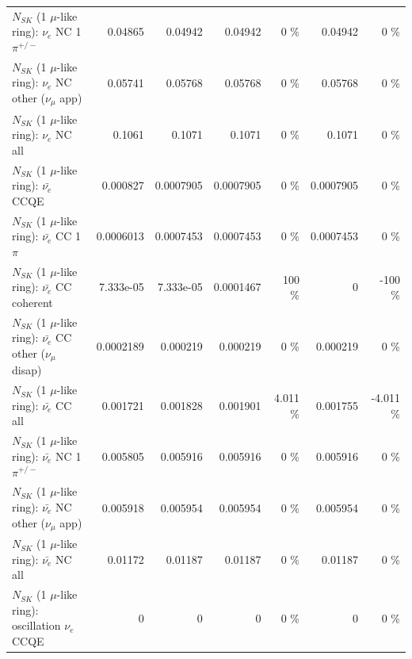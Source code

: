 \begin{table}
\begin{tabular}{| l | r | r | r  r | r  r |}
\hline
                           $N_{SK}$ (1 $\mu$-like ring): $\nu_e$ NC 1$\pi^{+/-}$ &         0.04865 &         0.04942 &         0.04942 &        0 \%  &         0.04942 &        0 \%  \\ 
                  $N_{SK}$ (1 $\mu$-like ring): $\nu_e$ NC other ($\nu_\mu$ app) &         0.05741 &         0.05768 &         0.05768 &        0 \%  &         0.05768 &        0 \%  \\ 
                                  $N_{SK}$ (1 $\mu$-like ring): $\nu_{e}$ NC all &          0.1061 &          0.1071 &          0.1071 &        0 \%  &          0.1071 &        0 \%  \\ 
\hline
\hline
\hline
                                $N_{SK}$ (1 $\mu$-like ring): $\bar{\nu_e}$ CCQE &        0.000827 &       0.0007905 &       0.0007905 &        0 \%  &       0.0007905 &        0 \%  \\ 
                           $N_{SK}$ (1 $\mu$-like ring): $\bar{\nu_e}$ CC 1$\pi$ &       0.0006013 &       0.0007453 &       0.0007453 &        0 \%  &       0.0007453 &        0 \%  \\ 
                         $N_{SK}$ (1 $\mu$-like ring): $\bar{\nu_e}$ CC coherent &       7.333e-05 &       7.333e-05 &       0.0001467 &      100 \%  &               0 &     -100 \%  \\ 
          $N_{SK}$ (1 $\mu$-like ring): $\bar{\nu_e}$ CC other ($\nu_\mu$ disap) &       0.0002189 &        0.000219 &        0.000219 &        0 \%  &        0.000219 &        0 \%  \\ 
                            $N_{SK}$ (1 $\mu$-like ring): $\bar{\nu_{e}}$ CC all &        0.001721 &        0.001828 &        0.001901 &    4.011 \%  &        0.001755 &   -4.011 \%  \\ 
\hline
                     $N_{SK}$ (1 $\mu$-like ring): $\bar{\nu_e}$ NC 1$\pi^{+/-}$ &        0.005805 &        0.005916 &        0.005916 &        0 \%  &        0.005916 &        0 \%  \\ 
            $N_{SK}$ (1 $\mu$-like ring): $\bar{\nu_e}$ NC other ($\nu_\mu$ app) &        0.005918 &        0.005954 &        0.005954 &        0 \%  &        0.005954 &        0 \%  \\ 
                            $N_{SK}$ (1 $\mu$-like ring): $\bar{\nu_{e}}$ NC all &         0.01172 &         0.01187 &         0.01187 &        0 \%  &         0.01187 &        0 \%  \\ 
\hline
\hline
\hline
                          $N_{SK}$ (1 $\mu$-like ring): oscillation $\nu_e$ CCQE &               0 &               0 &               0 &        0 \%  &               0 &        0 \%  \\ 

\end{tabular}
\end{table}
